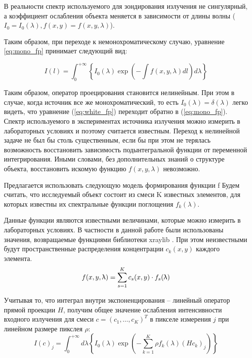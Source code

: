 В реальности спектр используемого для зондирования излучения не сингулярный, а коэффициент ослабления объекта меняется в зависимости от длины волны ($I_0 = I_0(\lambda), f(x, y) = f(x, y, \lambda)$).

Таким образом, при переходе к немонохроматическому случаю, уравнение \ref{eq:mono_fp} принимает следующий вид:

\begin{equation}
\label{eq:white_fp}
I(l) = \int_0^{+\infty}{\left\{
  I_0(\lambda) \exp{\left(-\int{f(x, y, \lambda) dl} \right) d\lambda} 
  \right\}}  
\end{equation}

Таким образом, оператор проецирования становится нелинейным.
При этом в случае, когда источник все же монохроматический, то есть $I_0(\lambda) = \delta(\lambda)$ легко видеть, что уравнение (\ref{eq:white_fp}) переходит обратно в (\ref{eq:mono_fp}).
Спектр используемого в экспериментах источника излучения можно измерить в лабораторных условиях и поэтому считается известным.
Переход к нелинейной задаче не был бы столь существенным, если бы при этом не терялась возможность восстановить зависимость подынтегральной функции от переменной интегрирования. 
Иными словами, без дополнительных знаний о структуре объекта, восстановить искомую функцию $f(x, y, \lambda)$ невозможно.

Предлагается использовать следующую модель формирования функции f %
Будем считать, что исследуемый объект состоит из смеси K известных элементов, для которых известны их спектральные функции поглощения $f_k(\lambda)$.

Данные функции являются известными величинами, которые можно измерить в лабораторных условиях. В частности в данной работе были использованы значения, возвращаемые функциями библиотеки xraylib \cite{xraylib}.
При этом неизвестными будут пространственные распределения концентрации $c_k(x, y)$ каждого элемента.
\begin{equation}
 \notag
  f(x, y, \lambda) = \sum_{s=1}^K {c_s(x, y) \cdot f_s(\lambda)}
\end{equation}

Учитывая то, что интеграл внутри экспоненцирования – линейный оператор прямой проекции $H$, получим общее значение ослабления интенсивности входного излучения для смеси $c = (c_1, \dots, c_K)^T $ в пикселе измерения $j$ при линейном размере пикслея $\rho$:
\begin{equation}
  \label{eq:white_fp_final}
  I(c)_j = \int_0^{+\infty} {d\lambda \left\{
    I_0(\lambda) \exp{\left(
      -\sum_{k=1}^K {\rho f_k(\lambda) (H c_k)_j} 
      \right)}
  \right\}}
\end{equation}

